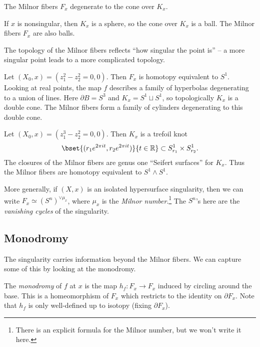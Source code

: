 \documentclass{article}
\begin{document}
The Milnor fibers $F_x$ degenerate to the cone over $K_x$.

\begin{ex}
	If $x$ is nonsingular, then $K_x$ is a sphere, so the cone over $K_x$ is a ball.
	The Milnor fibers $F_x$ are also balls.
\end{ex}

The topology of the Milnor fibers reflects ``how singular the point is'' -- a more singular point leads to a more complicated topology.

\begin{ex}
	Let $(X_0, x) = (z_1^2 - z_2^2 = 0, 0)$.
	Then $F_x$ is homotopy equivalent to $S^1$.
	Looking at real points, the map $f$ describes a family of hyperbolas degenerating to a union of lines.
	Here $\partial B = S^3$ and $K_x = S^1 \sqcup S^1$, so topologically $K_x$ is a double cone.
	The Milnor fibers form a family of cylinders degenerating to this double cone.
\end{ex}

\begin{ex}
	Let $(X_0, x) = (z_1^3 - z_2^2 = 0, 0)$.
	Then $K_x$ is a trefoil knot
	\[
		\bset{(r_1 e^{2\pi i t}, r_2 e^{2 \pi i t})}{t \in \RR} \subset S^1_{r_1} \times S^1_{r_2}.
	\]
	The closures of the Milnor fibers are genus one ``Seifert surfaces'' for $K_x$.
	Thus the Milnor fibers are homotopy equivalent to $S^1 \wedge S^1$.
\end{ex}

More generally, if $(X, x)$ is an isolated hypersurface singularity, then we can write $F_x \simeq (S^n)^{\vee \mu_x}$, where $\mu_x$ is the \emph{Milnor number}.\footnote{There is an explicit formula for the Milnor number, but we won't write it here.}
The $S^n$'s here are the \emph{vanishing cycles} of the singularity.

\subsection{Monodromy}

The singularity carries information beyond the Milnor fibers.
We can capture some of this by looking at the monodromy.

\begin{dfn}
	The \emph{monodromy} of $f$ at $x$ is the map $h_f: F_x \to F_x$ induced by circling around the base.
	This is a homeomorphism of $F_x$ which restricts to the identity on $\partial F_x$.
	Note that $h_f$ is only well-defined up to isotopy (fixing $\partial F_x$).
\end{dfn}
\end{document}
